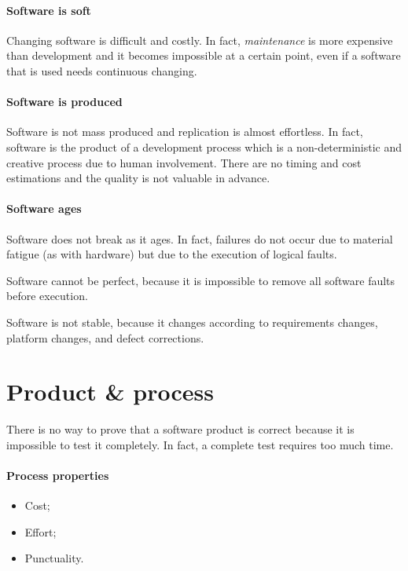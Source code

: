 \paragraph{Software is soft} Changing software is difficult and costly. In fact, \emph{maintenance} is more expensive than development and it becomes impossible at a certain point, even if a software that is used needs continuous changing.

\paragraph{Software is produced} Software is not mass produced and replication is almost effortless. In fact, software is the product of a development process which is a non-deterministic and creative process due to human involvement. There are no timing and cost estimations and the quality is not valuable in advance.

\paragraph{Software ages} Software does not break as it ages. In fact, failures do not occur due to material fatigue (as with hardware) but due to the execution of logical faults.

Software cannot be perfect, because it is impossible to remove all software faults before execution.

Software is not stable, because it changes according to requirements changes, platform changes, and defect corrections.

\section{Product \& process}
There is no way to prove that a software product is correct because it is impossible to test it completely. In fact, a complete test requires too much time.

\paragraph{Process properties}
\begin{itemize}
\item Cost;
\item Effort;
\item Punctuality.
\end{itemize}

